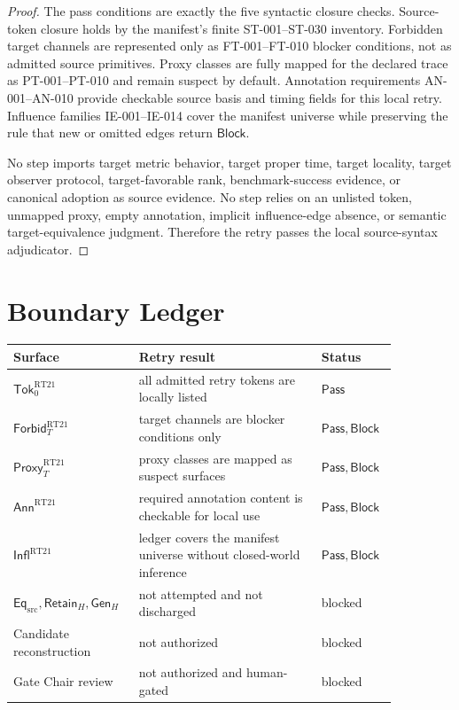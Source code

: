 \documentclass[11pt]{article}
\newcommand{\GenH}{\mathsf{Gen}_{H}}
\newcommand{\EqSrc}{\mathsf{Eq}_{\mathrm{src}}}
\newcommand{\RetainH}{\mathsf{Retain}_{H}}
\newcommand{\SrcTok}{\mathsf{Tok}_{0}}
\newcommand{\ForbidT}{\mathsf{Forbid}_{T}}
\newcommand{\ProxyT}{\mathsf{Proxy}_{T}}
\newcommand{\Annot}{\mathsf{Ann}}
\newcommand{\Influence}{\mathsf{Infl}}
\newcommand{\Pass}{\mathsf{Pass}}
\newcommand{\Block}{\mathsf{Block}}
\begin{document}
\begin{proof}
The pass conditions are exactly the five syntactic closure checks.
Source-token closure holds by the manifest's finite ST-001--ST-030
inventory. Forbidden target channels are represented only as FT-001--FT-010
blocker conditions, not as admitted source primitives. Proxy classes are
fully mapped for the declared trace as PT-001--PT-010 and remain suspect by
default. Annotation requirements AN-001--AN-010 provide checkable source
basis and timing fields for this local retry. Influence families IE-001--IE-014
cover the manifest universe while preserving the rule that new or omitted
edges return \(\Block\).

No step imports target metric behavior, target proper time, target locality,
target observer protocol, target-favorable rank, benchmark-success
evidence, or canonical adoption as source evidence. No step relies on an
unlisted token, unmapped proxy, empty annotation, implicit influence-edge
absence, or semantic target-equivalence judgment. Therefore the retry
passes the local source-syntax adjudicator.
\end{proof}

\section{Boundary Ledger}

\begin{center}
\begin{tabular}{p{0.24\linewidth}p{0.44\linewidth}p{0.18\linewidth}}
\textbf{Surface} & \textbf{Retry result} & \textbf{Status} \\
\hline
\(\SrcTok^{\mathrm{RT21}}\) & all admitted retry tokens are locally listed & \(\Pass\) \\
\(\ForbidT^{\mathrm{RT21}}\) & target channels are blocker conditions only & \(\Pass,\Block\) \\
\(\ProxyT^{\mathrm{RT21}}\) & proxy classes are mapped as suspect surfaces & \(\Pass,\Block\) \\
\(\Annot^{\mathrm{RT21}}\) & required annotation content is checkable for local use & \(\Pass,\Block\) \\
\(\Influence^{\mathrm{RT21}}\) & ledger covers the manifest universe without closed-world inference & \(\Pass,\Block\) \\
\(\EqSrc,\RetainH,\GenH\) & not attempted and not discharged & blocked \\
Candidate reconstruction & not authorized & blocked \\
Gate Chair review & not authorized and human-gated & blocked \\
\end{tabular}
\end{center}
\end{document}
